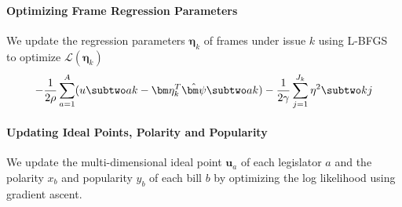 \paragraph{Optimizing Frame Regression Parameters}
\label{subsec:c6_upadte_eta}

We update the regression parameters $\bm \eta_k$ of frames under issue $k$ using
L-BFGS~\cite{Liu:MP89:lbfgs} to optimize $\mathcal{L}(\bm \eta_k)$
\begin{equation}
  - \frac{1}{2 \rho} \sum_{a=1}^A (u \subtwo ak - \bm \eta_k^T \hat{\bm \psi} \subtwo ak)
  - \frac{1}{2 \gamma} \sum_{j=1}^{J_k} \eta^2 \subtwo kj
\end{equation}

\paragraph{Updating Ideal Points, Polarity and Popularity}
\label{subsec:c6_upadte_ideal_point}

We update the multi-dimensional ideal point $\bm u_a$ of each legislator $a$ and
the polarity $x_b$ and popularity $y_b$ of each bill $b$ by optimizing the log
likelihood using gradient ascent.















